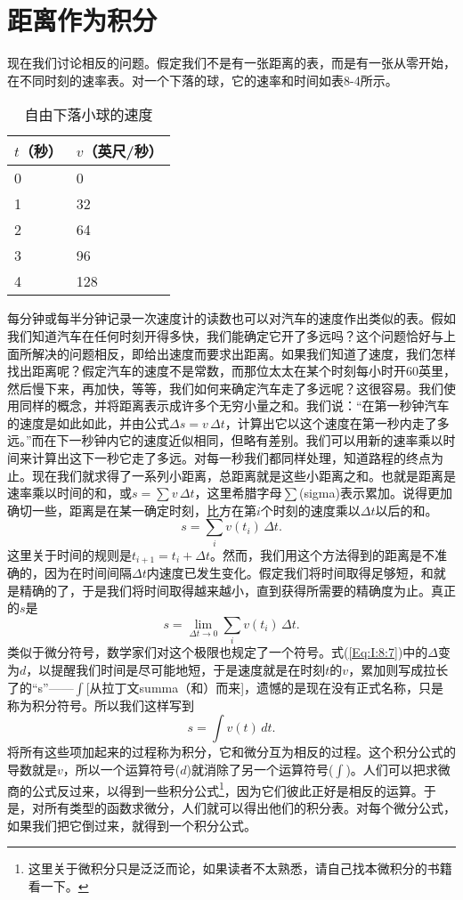 \documentclass[12pt,oneside]{book}
\begin{document}
\section{距离作为积分}
现在我们讨论相反的问题。假定我们不是有一张距离的表，而是有一张从零开始，在不同时刻的速率表。对一个下落的球，它的速率和时间如表8-4所示。
\begin{table}[H]
\centering
\caption{自由下落小球的速度}
\label{tab:8-2}
\medskip 
\begin{tabular}{@{}ll@{}}
\toprule
$t$（秒） & $v$（英尺/秒）  \\ \midrule
0  & 0  \\
1  & 32 \\
2  & 64 \\
3  & 96 \\
4  & 128 
 \\ \bottomrule
\end{tabular}
\end{table}

每分钟或每半分钟记录一次速度计的读数也可以对汽车的速度作出类似的表。假如我们知道汽车在任何时刻开得多快，我们能确定它开了多远吗？这个问题恰好与上面所解决的问题相反，即给出速度而要求出距离。如果我们知道了速度，我们怎样找出距离呢？假定汽车的速度不是常数，而那位太太在某个时刻每小时开60英里，然后慢下来，再加快，等等，我们如何来确定汽车走了多远呢？这很容易。我们使用同样的概念，并将距离表示成许多个无穷小量之和。我们说：“在第一秒钟汽车的速度是如此如此，并由公式$\Delta s=v\,\Delta t$，计算出它以这个速度在第一秒内走了多远。”而在下一秒钟内它的速度近似相同，但略有差别。我们可以用新的速率乘以时间来计算出这下一秒它走了多远。对每一秒我们都同样处理，知道路程的终点为止。现在我们就求得了一系列小距离，总距离就是这些小距离之和。也就是距离是速率乘以时间的和，或$s=\sum v\,\Delta t$，这里希腊字母$\sum$(sigma)表示累加。说得更加确切一些，距离是在某一确定时刻，比方在第$i$个时刻的速度乘以$\Delta t$以后的和。
\begin{equation}
\label{Eq:I:8:6}
s=\sum_iv(t_i)\,\Delta t.
\end{equation}
这里关于时间的规则是$t_{i+1}=t_i+\Delta t$。然而，我们用这个方法得到的距离是不准确的，因为在时间间隔$\Delta t$内速度已发生变化。假定我们将时间取得足够短，和就是精确的了，于是我们将时间取得越来越小，直到获得所需要的精确度为止。真正的$s$是
\begin{equation}
\label{Eq:I:8:7}
s=\lim_{\Delta t\to0}\sum_iv(t_i)\,\Delta t.
\end{equation}
类似于微分符号，数学家们对这个极限也规定了一个符号。式(\ref{Eq:I:8:7})中的$\Delta$变为$d$，以提醒我们时间是尽可能地短，于是速度就是在时刻$t$的$v$，累加则写成拉长了的“s”——$\int$[从拉丁文summa（和）而来]，遗憾的是现在没有正式名称，只是称为积分符号。所以我们这样写到
\begin{equation}
\label{Eq:I:8:8}
s=\int v(t)\,dt.
\end{equation}
将所有这些项加起来的过程称为积分，它和微分互为相反的过程。这个积分公式的导数就是$v$，所以一个运算符号($d$)就消除了另一个运算符号($\int$)。人们可以把求微商的公式反过来，以得到一些积分公式\footnote{这里关于微积分只是泛泛而论，如果读者不太熟悉，请自己找本微积分的书籍看一下。}，因为它们彼此正好是相反的运算。于是，对所有类型的函数求微分，人们就可以得出他们的积分表。对每个微分公式，如果我们把它倒过来，就得到一个积分公式。
\end{document}
